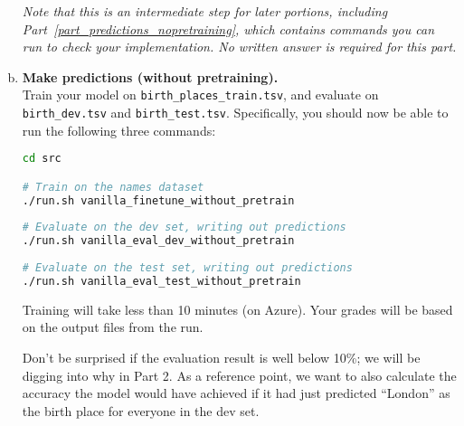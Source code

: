 \begin{enumerate}[(a)]
\textit{Note that this is an intermediate step for later portions, including Part~\ref{part_predictions_nopretraining}, which contains commands you can run to check your implementation. No written answer is required for this part.}


\item {}  \textbf{Make predictions (without pretraining).}\label{part_predictions_nopretraining}\\ 
Train your model on \texttt{birth\_places\_train.tsv}, and evaluate on \texttt{birth\_dev.tsv} and \texttt{birth\_test.tsv}. Specifically, you should now be able to run the following three commands:
\begin{lstlisting}[language=bash]
cd src

# Train on the names dataset
./run.sh vanilla_finetune_without_pretrain
        
# Evaluate on the dev set, writing out predictions
./run.sh vanilla_eval_dev_without_pretrain
        
# Evaluate on the test set, writing out predictions
./run.sh vanilla_eval_test_without_pretrain
\end{lstlisting}

Training will take less than 10 minutes (on Azure). Your grades will be based on the output files from the run.

Don't be surprised if the evaluation result is well below 10\%; we will be digging into why in Part 2. As a reference point, we want to also calculate the accuracy the model would have achieved if it had just predicted ``London'' as the birth place for everyone in the dev set. 



\end{enumerate}
